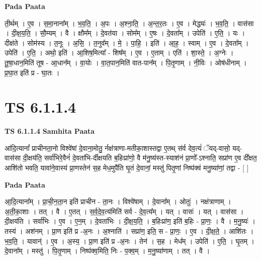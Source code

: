 \documentclass[17pt]{extarticle}
\begin{document}
\textbf{Pada Paata} \newline

ती॒र्थम् । ए॒व । स॒मा॒नाना᳚म् । भ॒व॒ति॒ । अ॒पः । अ॒श्ना॒ति॒ । अ॒न्त॒र॒तः । ए॒व । मेद्ध्यः॑ । भ॒व॒ति॒ । वास॑सा । दी॒क्ष॒य॒ति॒ । सौ॒म्यम् । वै । क्षौम᳚म् । दे॒वत॑या । सोम᳚म् । ए॒षः । दे॒वता᳚म् । उपेति॑ । ए॒ति॒ । यः । दीक्ष॑ते । सोम॑स्य । त॒नूः । अ॒सि॒ । त॒नुव᳚म् । मे॒ । पा॒हि॒ । इति॑ । आ॒ह॒ । स्वाम् । ए॒व । दे॒वता᳚म् । उपेति॑ । ए॒ति॒ । अथो॒ इति॑ । आ॒शिष॒मित्या᳚ - शिष᳚म् । ए॒व । ए॒ताम् । एति॑ । शा॒स्ते॒ । अ॒ग्नेः । तू॒षा॒धान॒मिति॑ तूष - आ॒धान᳚म् । वा॒योः । वा॒त॒पान॒मिति॑ वात-पान᳚म् । पि॒तृ॒णाम् । नी॒विः । ओष॑धीनाम् । प्र॒घा॒त इति॑ प्र - घा॒तः ।  \newline





\section{ TS 6.1.1.4 }

\textbf{TS 6.1.1.4 } \newline
\textbf{Samhita Paata} \newline

आ॑दि॒त्यानां᳚ प्राचीनता॒नो विश्वे॑षां दे॒वाना॒मोतु॒ र्नक्ष॑त्राणा-मतीका॒शास्तद्वा ए॒तथ् स॑र्व देव॒त्यं॑ ॅयद्-वासो॒ यद्-वास॑सा दी॒क्षय॑ति॒ सर्वा॑भिरे॒वैनं॑ दे॒वता॑भि-र्दीक्षयति ब॒हिःप्रा॑णो॒ वै म॑नु॒ष्य॑स्त-स्याश॑नं प्रा॒णो᳚-ऽश्नाति॒ सप्रा॑ण ए॒व दी᳚क्षत॒ आशि॑तो भवति॒ यावा॑ने॒वास्य॑ प्रा॒णस्तेन॑ स॒ह मेध॒मुपै॑ति घृ॒तं दे॒वानां॒ मस्तु॑ पितृ॒णां निष्प॑क्वं मनु॒ष्या॑णां॒ तद्वा - [  ] \newline

\textbf{Pada Paata} \newline

आ॒दि॒त्याना᳚म् । प्रा॒ची॒न॒ता॒न इति॑ प्राचीन - ता॒नः । विश्वे॑षाम् । दे॒वाना᳚म् । ओतुः॑ । नक्ष॑त्राणाम् । अ॒ती॒का॒शाः । तत् । वै । ए॒तत् । स॒र्व॒दे॒व॒त्य॑मिति॑ सर्व - दे॒व॒त्य᳚म् । यत् । वासः॑ । यत् । वास॑सा । दी॒क्षय॑ति । सर्वा॑भिः । ए॒व । ए॒न॒म् । दे॒वता॑भिः । दी॒क्ष॒य॒ति॒ । ब॒हिःप्रा॑ण॒ इति॑ ब॒हिः - प्रा॒णः॒ । वै । म॒नु॒ष्यः॑ । तस्य॑ । अश॑नम् । प्रा॒ण इति॑ प्र -अ॒नः । अ॒श्नाति॑ । सप्रा॑ण॒ इति॒ स - प्रा॒णः॒ । ए॒व । दी॒क्ष॒ते॒ । आशि॑तः । भ॒व॒ति॒ । यावान्॑ । ए॒व । अ॒स्य॒ । प्रा॒ण इति॑ प्र -अ॒नः । तेन॑ । स॒ह । मेध᳚म् । उपेति॑ । ए॒ति॒ । घृ॒तम् । दे॒वाना᳚म् । मस्तु॑ । पि॒तृ॒णाम् । निष्प॑क्व॒मिति॒ निः - प॒क्व॒म् । म॒नु॒ष्या॑णाम् । तत् । वै ।  \newline
\end{document}
